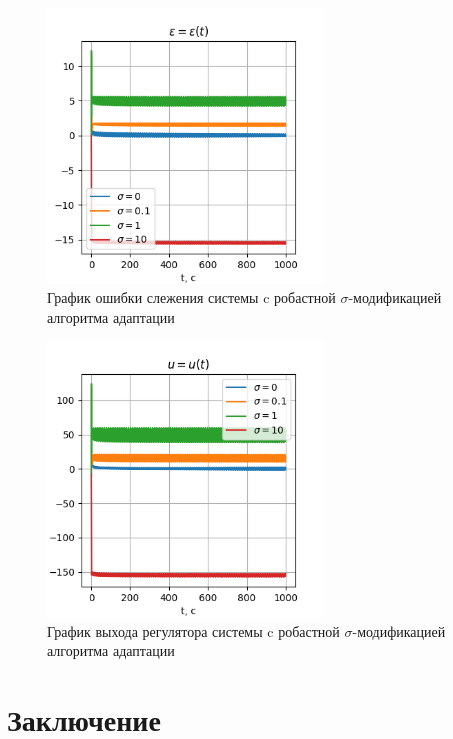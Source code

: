 \documentclass{article}
\begin{document}
\begin{figure}[h!]
  \centering
  \includegraphics[width=0.65\textwidth]{figs/3_epsilon.png}
  \caption{График ошибки слежения системы c робастной $\sigma$-модификацией алгоритма адаптации} 
  \label{fig:task1_y}
\end{figure}

\begin{figure}[h!]
  \centering
  \includegraphics[width=0.65\textwidth]{figs/3_u.png}
  \caption{График выхода регулятора системы c робастной $\sigma$-модификацией алгоритма адаптации} 
  \label{fig:task1_y}
\end{figure}

\FloatBarrier
\section{Заключение}
\end{document}
